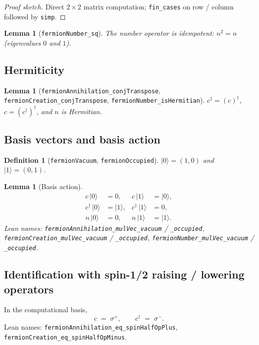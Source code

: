 \documentclass[a4paper,11pt]{article}
\newtheorem{lemma}[theorem]{Lemma}
\newtheorem{definition}[theorem]{Definition}
\begin{document}
\begin{proof}[Proof sketch]
Direct $2 \times 2$ matrix computation; \texttt{fin\_cases} on row /
column followed by \texttt{simp}.
\end{proof}

\begin{lemma}[\texttt{fermionNumber\_sq}]
The number operator is idempotent: $n^2 = n$ (eigenvalues $0$ and $1$).
\end{lemma}

\subsection{Hermiticity}

\begin{lemma}[\texttt{fermionAnnihilation\_conjTranspose}, \texttt{fermionCreation\_conjTranspose}, \texttt{fermionNumber\_isHermitian}]
$c^\dagger = (c)^\dagger$, $c = (c^\dagger)^\dagger$, and $n$ is
Hermitian.
\end{lemma}

\subsection{Basis vectors and basis action}

\begin{definition}[\texttt{fermionVacuum}, \texttt{fermionOccupied}]
$|0\rangle = (1, 0)$ and $|1\rangle = (0, 1)$.
\end{definition}

\begin{lemma}[Basis action]
\begin{align*}
  c\,|0\rangle &= 0, & c\,|1\rangle &= |0\rangle, \\
  c^\dagger\,|0\rangle &= |1\rangle, & c^\dagger\,|1\rangle &= 0, \\
  n\,|0\rangle &= 0, & n\,|1\rangle &= |1\rangle.
\end{align*}
Lean names: \texttt{fermionAnnihilation\_mulVec\_vacuum} /
\texttt{\_occupied},
\texttt{fermionCreation\_mulVec\_vacuum} / \texttt{\_occupied},
\texttt{fermionNumber\_mulVec\_vacuum} / \texttt{\_occupied}.
\end{lemma}

\subsection{Identification with spin-1/2 raising / lowering operators}

In the computational basis,
\[
  c \;=\; \sigma^+,
  \qquad
  c^\dagger \;=\; \sigma^-.
\]
Lean names: \texttt{fermionAnnihilation\_eq\_spinHalfOpPlus},
\texttt{fermionCreation\_eq\_spinHalfOpMinus}.
\end{document}
